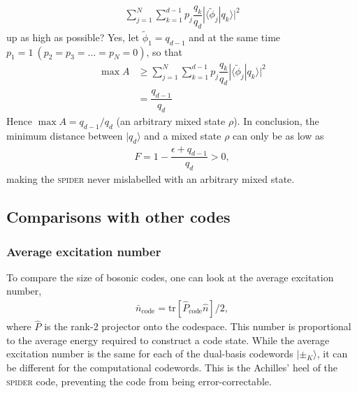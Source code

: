 \documentclass[%
 reprint,
superscriptaddress,
 amsmath,amssymb,
 aps,13pt
]{revtex4-2}
\begin{document}
\begin{align}
    \sum_{j=1}^N\sum_{k=1}^{d-1} p_j \dfrac{q_k}{q_d} |\langle\tilde{\phi}_j|q_k\rangle|^2
\end{align}
up as high as possible? Yes, let $\tilde{\phi}_1=q_{d-1}$ and at the same time $p_1=1\ (p_2=p_3=\dots=p_N=0)$, so that
\begin{align}
\max A &\geq \sum_{j=1}^N\sum_{k=1}^{d-1} p_j \dfrac{q_k}{q_d} |\langle\tilde{\phi}_j|q_k\rangle|^2\\
&= \dfrac{q_{d-1}}{q_d} 
\end{align}
Hence $\max A = {q_{d-1}}/{q_d}$ (an arbitrary mixed state $\rho$). In conclusion, the minimum distance between $|q_d\rangle$ and a mixed state $\rho$ can only be as low as
\begin{align}
F = 1-\dfrac{\epsilon+q_{d-1}}{q_d} > 0,
\end{align}
making the \textsc{spider} never mislabelled with an arbitrary mixed state. 
\subsection{Comparisons with other codes}
\subsubsection{Average excitation number}
To compare the size of bosonic codes, one can look at the average excitation number,
\begin{align}
    \bar{n}_{\text{code}} = \text{tr}[\hat{P}_{\text{code}}\hat{n}]/2,
\end{align}
where $\hat{P}$ is the rank-2 projector onto the codespace. This number is proportional to the average energy required to construct a code state. While the average excitation number is the same for each of the dual-basis codewords $|\pm_K\rangle$, it can be different for the computational codewords. This is the Achilles' heel of the \textsc{spider} code, preventing the code from being error-correctable.

\end{document}
